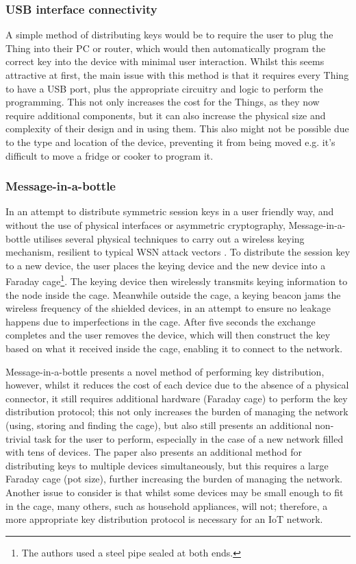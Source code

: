 \documentclass{mprop}
\begin{document}
\subsubsection{USB interface connectivity} %
\label{ssub:usb_interface_connectivity}
A simple method of distributing keys would be to require the user to plug the Thing into their PC or router, which would then automatically program the correct key into the device with minimal user interaction. Whilst this seems attractive at first, the main issue with this method is that it requires every Thing to have a USB port, plus the appropriate circuitry and logic to perform the programming. This not only increases the cost for the Things, as they now require additional components, but it can also increase the physical size and complexity of their design and in using them. This also might not be possible due to the type and location of the device, preventing it from being moved e.g. it's difficult to move a fridge or cooker to program it.

\subsubsection{Message-in-a-bottle} %
\label{ssub:message_in_a_bottle}
In an attempt to distribute symmetric session keys in a user friendly way, and without the use of physical interfaces or asymmetric cryptography, Message-in-a-bottle utilises several physical techniques to carry out a wireless keying mechanism, resilient to typical WSN attack vectors \cite{MessageBottle}. To distribute the session key to a new device, the user places the keying device and the new device into a Faraday cage\footnote{The authors used a steel pipe sealed at both ends.}. The keying device then wirelessly transmits keying information to the node inside the cage. Meanwhile outside the cage, a keying beacon jams the wireless frequency of the shielded devices, in an attempt to ensure no leakage happens due to imperfections in the cage. After five seconds the exchange completes and the user removes the device, which will then construct the key based on what it received inside the cage, enabling it to connect to the network.

Message-in-a-bottle presents a novel method of performing key distribution, however, whilst it reduces the cost of each device due to the absence of a physical connector, it still requires additional hardware (Faraday cage) to perform the key distribution protocol; this not only increases the burden of managing the network (using, storing and finding the cage), but also still presents an additional non-trivial task for the user to perform, especially in the case of a new network filled with tens of devices. The paper also presents an additional method for distributing keys to multiple devices simultaneously, but this requires a large Faraday cage (pot size), further increasing the burden of managing the network. Another issue to consider is that whilst some devices may be small enough to fit in the cage, many others, such as household appliances, will not; therefore, a more appropriate key distribution protocol is necessary for an IoT network.
\end{document}
